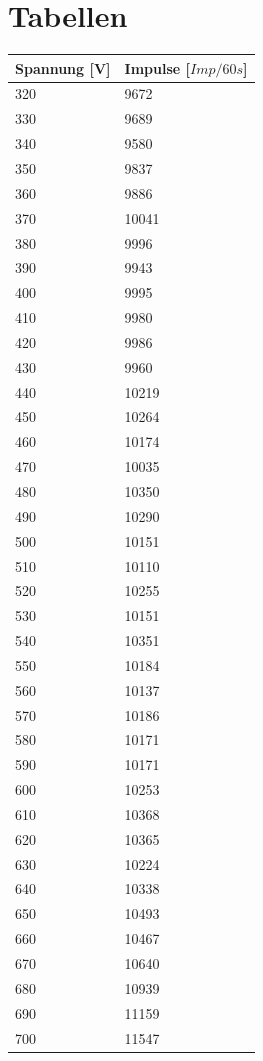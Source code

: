 \section{Tabellen}
\begin{minipage}{\linewidth}
    \begin{table}[H]
        \centering
    
    \begin{tabular}{ll}
        \toprule
        Spannung [V] & Impulse [$Imp/60s$]\\
        \midrule
        320 &	9672   \\   
        330 &	9689   \\  
        340 &	9580   \\   
        350 &	9837   \\   
        360 &	9886   \\    
        370 &	10041  \\    
        380 &	9996   \\   
        390 &	9943   \\   
        400 &	9995   \\   
        410 &	9980   \\    
        420 &	9986   \\   
        430 &	9960   \\  
        440 &	10219  \\
        450 &	10264  \\
        460 &	10174  \\
        470 &	10035  \\
        480 &	10350  \\
        490 &	10290  \\
        500 &	10151  \\
        510 &	10110  \\
        520 &	10255  \\
        530 &	10151  \\
        540 &	10351  \\
        550 &	10184  \\
        560 &	10137  \\
        570 &	10186  \\
        580 &	10171  \\
        590 &	10171  \\
        600 &	10253  \\
        610 &	10368  \\
        620 &	10365  \\
        630 &	10224  \\
        640 &	10338  \\
        650 &	10493  \\
        660 &	10467  \\
        670 &	10640  \\
        680 &	10939  \\
        690 &	11159  \\
        700 &	11547  \\      
        \bottomrule
        

\end{tabular}
\end{table}
\end{minipage}
